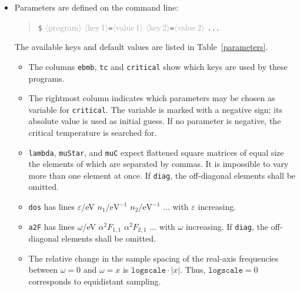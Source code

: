 \documentclass[a4paper]{article}
\let\epsilon\varepsilon
\def\dummy#1{\textcolor{darkgray}{$\langle$#1$\rangle$}}
\begin{document}
   \begin{itemize}
      \item
         Parameters are defined on the command line:
         \begin{quote}
            \verb|$| \dummy{program}
               \dummy{key\,1}\verb|=|\dummy{value\,1}
               \dummy{key\,2}\verb|=|\dummy{value\,2} \verb|...|
         \end{quote}
         The available keys and default values are listed in
         Table~\ref{parameters}.
         \begin{itemize}[itemsep=0pt]
            \item
               The columns \texttt{ebmb}, \texttt{tc} and \texttt{critical} show
               which keys are used by these programs.

            \item
               The rightmost column indicates which parameters may be chosen as
               variable for \texttt{critical}. The variable is marked with a
               negative sign; its absolute value is used as initial guess. If no
               parameter is negative, the critical temperature is searched for.

            \item
               \texttt{lambda}, \texttt{muStar}, and \texttt{muC} expect
               flattened square matrices of equal size the elements of which
               are separated by commas. It is impossible to vary more than one
               element at once. If \texttt{diag}, the off-diagonal elements
               shall be omitted.

            \item
               \texttt{dos} has lines $\epsilon$/eV $n_1 / \mathrm{eV}^{-1}$
               $n_2 / \mathrm{eV}^{-1}$ $\dots$ with $\epsilon$ increasing.

            \item
               \texttt{a2F} has lines $\omega$/eV $\alpha^2 F_{1, 1}$ $\alpha^2
               F_{2, 1}$ $\dots$ with $\omega$ increasing. If \texttt{diag}, the
               off-diagonal elements shall be omitted.

            \item
               The relative change in the sample spacing of the real-axis
               frequencies between $\omega = 0$ and $\omega = x$ is
               $\texttt{logscale} \cdot |x|$. Thus, $\texttt{logscale} = 0$
               corresponds to equidistant sampling.
         \end{itemize}


\end{itemize}
\end{document}
